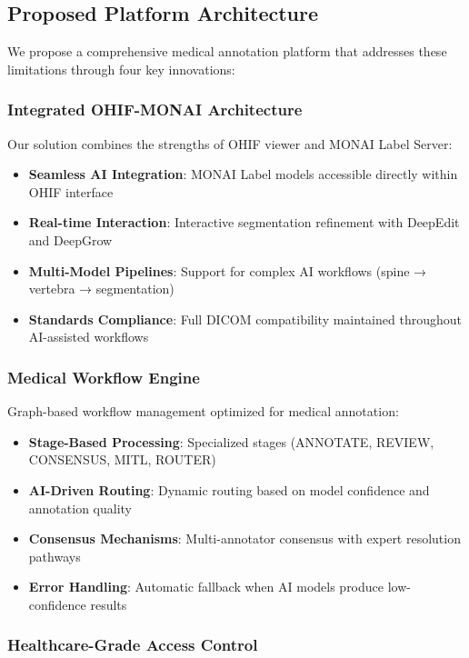\subsection{Proposed Platform Architecture}

We propose a comprehensive medical annotation platform that addresses these limitations through four key innovations:

\subsubsection{Integrated OHIF-MONAI Architecture}

Our solution combines the strengths of OHIF viewer and MONAI Label Server:

\begin{itemize}
    \item \textbf{Seamless AI Integration}: MONAI Label models accessible directly within OHIF interface
    \item \textbf{Real-time Interaction}: Interactive segmentation refinement with DeepEdit and DeepGrow
    \item \textbf{Multi-Model Pipelines}: Support for complex AI workflows (spine → vertebra → segmentation)
    \item \textbf{Standards Compliance}: Full DICOM compatibility maintained throughout AI-assisted workflows
\end{itemize}

\subsubsection{Medical Workflow Engine}

Graph-based workflow management optimized for medical annotation:

\begin{itemize}
    \item \textbf{Stage-Based Processing}: Specialized stages (ANNOTATE, REVIEW, CONSENSUS, MITL, ROUTER)
    \item \textbf{AI-Driven Routing}: Dynamic routing based on model confidence and annotation quality
    \item \textbf{Consensus Mechanisms}: Multi-annotator consensus with expert resolution pathways
    \item \textbf{Error Handling}: Automatic fallback when AI models produce low-confidence results
\end{itemize}

\subsubsection{Healthcare-Grade Access Control}

